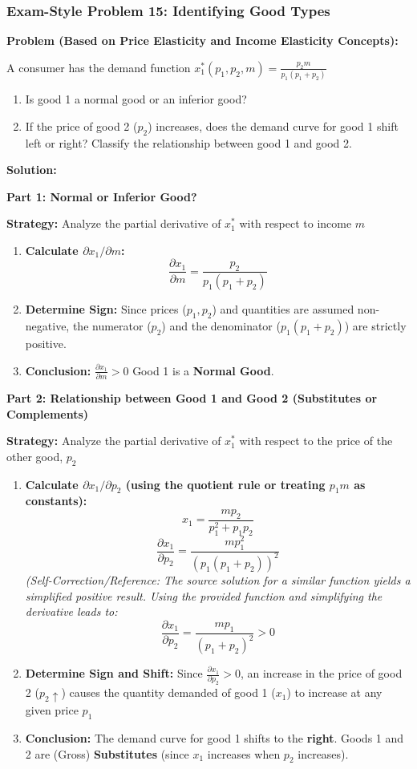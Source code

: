 \documentclass{article}
\begin{document}
\subsubsection*{Exam-Style Problem 15: Identifying Good Types}

\textbf{Problem (Based on Price Elasticity and Income Elasticity Concepts):}

A consumer has the demand function $x_1^*(p_1, p_2, m) = \frac{p_2 m}{p_1(p_1 + p_2)}$
\begin{enumerate}
    \item Is good 1 a normal good or an inferior good?
    \item If the price of good 2 ($p_2$) increases, does the demand curve for good 1 shift left or right? Classify the relationship between good 1 and good 2.
\end{enumerate}

\textbf{Solution:}

\textbf{Part 1: Normal or Inferior Good?}

\textbf{Strategy:} Analyze the partial derivative of $x_1^*$ with respect to income $m$
\begin{enumerate}
    \item \textbf{Calculate $\partial x_1 / \partial m$:}
    \[ \frac{\partial x_1}{\partial m} = \frac{p_2}{p_1(p_1 + p_2)} \]
    \item \textbf{Determine Sign:} Since prices ($p_1, p_2$) and quantities are assumed non-negative, the numerator ($p_2$) and the denominator ($p_1(p_1 + p_2)$) are strictly positive.
    \item \textbf{Conclusion:} $\frac{\partial x_1}{\partial m} > 0$ Good 1 is a \textbf{Normal Good}.
\end{enumerate}

\textbf{Part 2: Relationship between Good 1 and Good 2 (Substitutes or Complements)}

\textbf{Strategy:} Analyze the partial derivative of $x_1^*$ with respect to the price of the other good, $p_2$
\begin{enumerate}
    \item \textbf{Calculate $\partial x_1 / \partial p_2$ (using the quotient rule or treating $p_1 m$ as constants):}
    \[ x_1 = \frac{m p_2}{p_1^2 + p_1 p_2} \]
    \[ \frac{\partial x_1}{\partial p_2} = \frac{m p_1^2}{(p_1(p_1 + p_2))^2} \]
    \textit{(Self-Correction/Reference: The source solution for a similar function yields a simplified positive result. Using the provided function and simplifying the derivative leads to:}
    \[ \frac{\partial x_1}{\partial p_2} = \frac{m p_1}{(p_1+p_2)^2} > 0 \]
    \item \textbf{Determine Sign and Shift:} Since $\frac{\partial x_1}{\partial p_2} > 0$, an increase in the price of good 2 ($p_2 \uparrow$) causes the quantity demanded of good 1 ($x_1$) to increase at any given price $p_1$
    \item \textbf{Conclusion:} The demand curve for good 1 shifts to the \textbf{right}. Goods 1 and 2 are (Gross) \textbf{Substitutes} (since $x_1$ increases when $p_2$ increases).
\end{enumerate}
\end{document}
